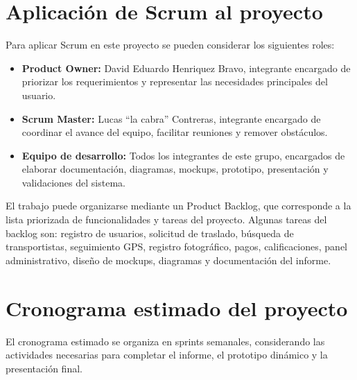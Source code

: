 \section{Aplicación de Scrum al proyecto}

Para aplicar Scrum en este proyecto se pueden considerar los siguientes roles:

\begin{itemize}
	\item \textbf{Product Owner:} David Eduardo Henriquez Bravo, integrante encargado de priorizar los requerimientos y representar las necesidades principales del usuario.
	\item \textbf{Scrum Master:} Lucas ``la cabra'' Contreras, integrante encargado de coordinar el avance del equipo, facilitar reuniones y remover obstáculos.
	\item \textbf{Equipo de desarrollo:} Todos los integrantes de este grupo, encargados de elaborar documentación, diagramas, mockups, prototipo, presentación y validaciones del sistema.
\end{itemize}

El trabajo puede organizarse mediante un Product Backlog, que corresponde a la lista priorizada de funcionalidades y tareas del proyecto. Algunas tareas del backlog son: registro de usuarios, solicitud de traslado, búsqueda de transportistas, seguimiento GPS, registro fotográfico, pagos, calificaciones, panel administrativo, diseño de mockups, diagramas y documentación del informe.

\section{Cronograma estimado del proyecto}

El cronograma estimado se organiza en sprints semanales, considerando las actividades necesarias para completar el informe, el prototipo dinámico y la presentación final.

